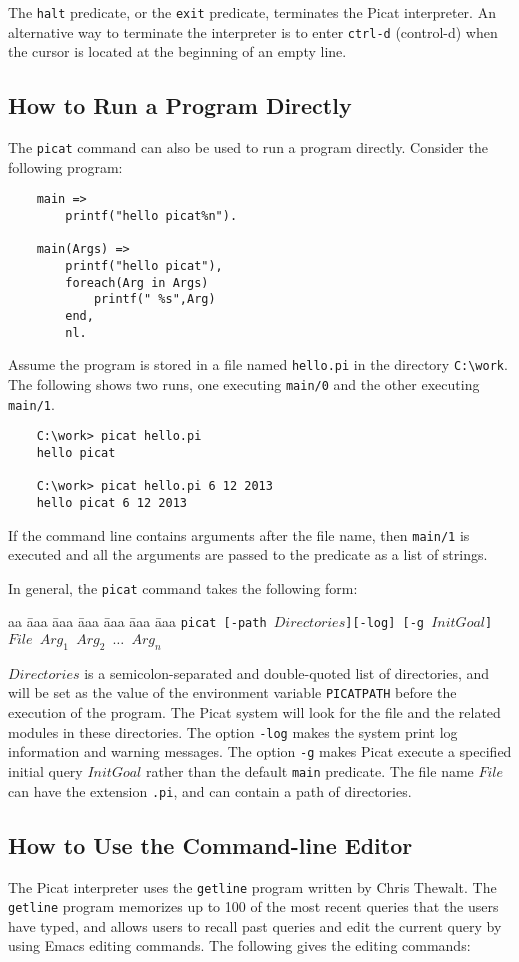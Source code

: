 The \texttt{halt} predicate, or the \texttt{exit} predicate, terminates the Picat interpreter. An alternative way to terminate the interpreter is to enter \verb+ctrl-d+ (control-d) when the cursor is located at the beginning of an empty line.

\subsection{How to Run a Program Directly}
The \texttt{picat} command can also be used to run a program directly. Consider the following program:
\begin{verbatim}
    main =>
        printf("hello picat%n").

    main(Args) =>
        printf("hello picat"),
        foreach(Arg in Args)
            printf(" %s",Arg)
        end,
        nl.
\end{verbatim}
Assume the program is stored in a file named \texttt{hello.pi} in the directory \verb+C:\work+. The following shows two runs, one executing \texttt{main/0} and the other executing \texttt{main/1}.
\begin{verbatim}
    C:\work> picat hello.pi
    hello picat

    C:\work> picat hello.pi 6 12 2013
    hello picat 6 12 2013
\end{verbatim}
If the command line contains arguments after the file name, then \texttt{main/1} is executed and all the arguments are passed to the predicate as a list of strings.

In general, the \texttt{picat} command takes the following form:
\begin{tabbing}
aa \= aaa \= aaa \= aaa \= aaa \= aaa \= aaa \kill
\> \> \texttt{picat [-path $Directories$][-log] [-g $InitGoal$] $File$ $Arg_1$ $Arg_2$ $\ldots$ $Arg_n$}
\end{tabbing}
$Directories$ is a semicolon-separated and double-quoted list of directories, and will be set as the value of the environment variable \texttt{PICATPATH} before the execution of the program. The Picat system will look for the file and the related modules in these directories. The option \texttt{-log} makes the system print log information and warning messages. The option \texttt{-g} makes Picat execute a specified initial query $InitGoal$ rather than the default \texttt{main} predicate. The file name $File$ can have the extension \texttt{.pi}, and can contain a path of directories.

\subsection{How to Use the Command-line Editor}
The Picat interpreter uses the \texttt{getline} program written by Chris Thewalt. The \texttt{getline} program memorizes up to 100 of the most recent queries that the users have typed, and allows users to recall past queries and edit the current query by using Emacs editing commands. The following gives the editing commands:


